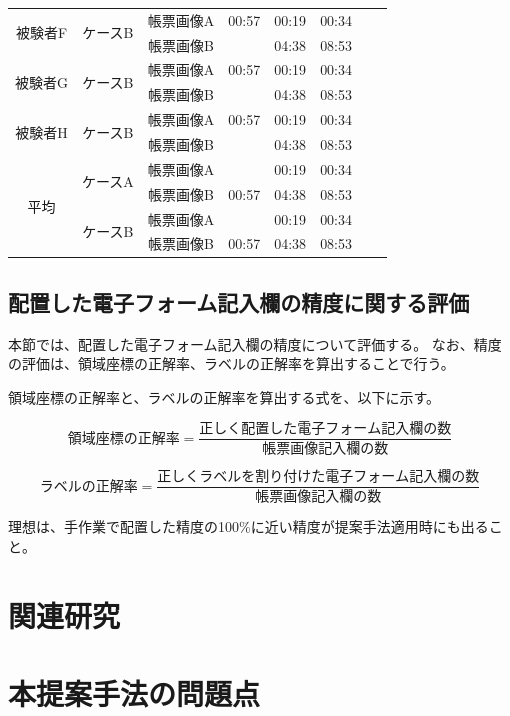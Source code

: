 \begin{table}[tp]
\begin{tabular}{ccc||rrrr|r}
		\multirow{2}{*}{被験者F} & \multirow{2}{*}{ケースB} & 帳票画像A & 00:57 & 00:19 & 00:34 \\
                                &                         & 帳票画像B & & 04:38 & 08:53 \\
                                                           \hline
		\multirow{2}{*}{被験者G} & \multirow{2}{*}{ケースB} & 帳票画像A & 00:57 & 00:19 & 00:34 \\
                                &                          & 帳票画像B & & 04:38 & 08:53 \\
                                                            \hline
		\multirow{2}{*}{被験者H} & \multirow{2}{*}{ケースB} & 帳票画像A & 00:57 & 00:19 & 00:34 \\
                                &                          & 帳票画像B & & 04:38 & 08:53 \\
                                                            \hline
		\hline \hline
		\multirow{4}{*}{平均}  & \multirow{2}{*}{ケースA} & 帳票画像A &  & 00:19 & 00:34 \\
                               &                         & 帳票画像B & 00:57 & 04:38 & 08:53 \\
                               & \multirow{2}{*}{ケースB} & 帳票画像A &  & 00:19 & 00:34 \\
                               &                          & 帳票画像B & 00:57 & 04:38 & 08:53 \\
	\end{tabular}
\end{table}

\subsection{配置した電子フォーム記入欄の精度に関する評価}\label{subsec:evalue_accuracy}
本節では、配置した電子フォーム記入欄の精度について評価する。
なお、精度の評価は、領域座標の正解率、ラベルの正解率を算出することで行う。

領域座標の正解率と、ラベルの正解率を算出する式を、以下に示す。

\begin{equation}
    領域座標の正解率=\frac{正しく配置した電子フォーム記入欄の数}{帳票画像記入欄の数}
\end{equation}

\begin{equation}
    ラベルの正解率=\frac{正しくラベルを割り付けた電子フォーム記入欄の数}{帳票画像記入欄の数}
\end{equation}

理想は、手作業で配置した精度の100\%に近い精度が提案手法適用時にも出ること。



\section{関連研究}\label{sec:relation_research}



\section{本提案手法の問題点}\label{sec:AWSEL_problems}